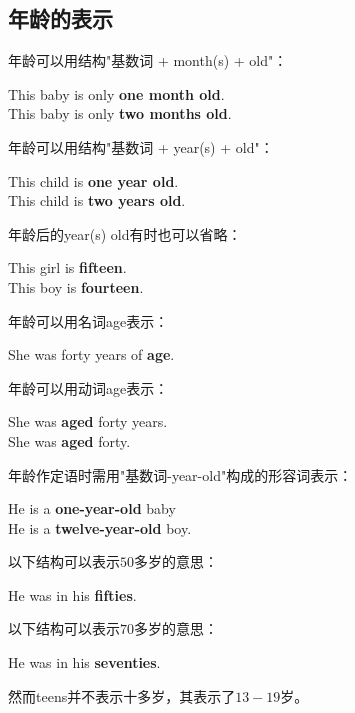 \documentclass[UTF8]{ctexart}
\newcommand{\littf}[1]{{\hspace{3pt}\ttfamily #1}}
\begin{document}
\newpage

\subsection{年龄的表示}
    年龄可以用结构\littf{"\hspace{0pt}基数词 + month(s) + old"}：
    \begin{center}
        \large\ttfamily
        This baby is only \textbf{one month old}.\\[3mm]
        This baby is only \textbf{two months old}.\\[6mm]
    \end{center}
    年龄可以用结构\littf{"\hspace{0pt}基数词 + year(s) + old"}：
    \begin{center}
        \large\ttfamily
        This child is \textbf{one year old}.\\[3mm]
        This child is \textbf{two years old}.\\[6mm]
    \end{center}
    年龄后的\littf{year(s) old}有时也可以省略：
    \begin{center}
        \large\ttfamily
        This girl is \textbf{fifteen}.\\[3mm]
        This boy is \textbf{fourteen}.\\[6mm]
    \end{center}
    年龄可以用名词\littf{age}表示：
    \begin{center}
        \large\ttfamily
        She was forty years of \textbf{age}.\\[6mm]
    \end{center}
    年龄可以用动词\littf{age}表示：
    \begin{center}
        \large\ttfamily
        She was \textbf{aged} forty years.\\[3mm]
        She was \textbf{aged} forty.\\[6mm]
    \end{center}
    年龄作定语时需用\littf{"\hspace{0pt}基数词-year-old"}构成的形容词表示：\
    \begin{center}
        \large\ttfamily
        He is a \textbf{one-year-old} baby\\[3mm]
        He is a \textbf{twelve-year-old} boy.\\[6mm]
    \end{center}
    以下结构可以表示$50$多岁的意思：
    \begin{center}
        \large\ttfamily
        He was in his \textbf{fifties}.\\[6mm]
    \end{center}
    以下结构可以表示$70$多岁的意思：
    \begin{center}
        \large\ttfamily
        He was in his \textbf{seventies}.\\[6mm]
    \end{center}
    然而\littf{teens}并不表示十多岁，其表示了$13-19$岁。
\end{document}
